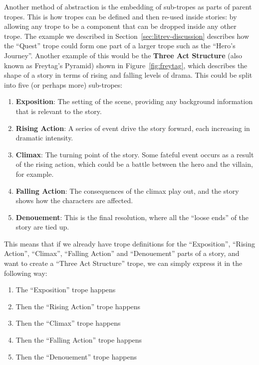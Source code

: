 \documentclass[11pt]{report}
\begin{document}
Another method of abstraction is the embedding of sub-tropes as parts of
parent tropes. This is how tropes can be defined and then re-used inside stories: by allowing any
trope to be a component that can be dropped inside any other trope.
The example we described in Section~\ref{sec:litrev-discussion}
describes how the ``Quest'' trope could form one part of a larger trope
such as the ``Hero's Journey''. Another example of this would be the
\textbf{Three Act Structure} (also known as Freytag's Pyramid) shown in Figure~\ref{fig:freytag}, which describes the shape of a
story in terms of rising and falling levels of drama. This could be split into
five (or perhaps more) sub-tropes:

\begin{enumerate}
  \item \textbf{Exposition}: The setting of the scene, providing any background
    information that is relevant to the story.
  \item \textbf{Rising Action}: A series of event drive the story forward, each
    increasing in dramatic intensity.
  \item \textbf{Climax}: The turning point of the story. Some fateful event
    occurs as a result of the rising action, which could be a battle between the
    hero and the villain, for example.
  \item \textbf{Falling Action}: The consequences of the climax play out, and
    the story shows how the characters are affected.
  \item \textbf{Denouement}: This is the final resolution, where all the ``loose
    ends'' of the story are tied up.
\end{enumerate}

This means that if we already have trope definitions for the ``Exposition'',
``Rising Action'', ``Climax'', ``Falling Action'' and ``Denouement'' parts of a
story, and want to create a ``Three Act Structure'' trope, we can simply express
it in the following way:

\begin{enumerate}
  \item The ``Exposition'' trope happens
  \item Then the ``Rising Action'' trope happens
  \item Then the ``Climax'' trope happens
  \item Then the ``Falling Action'' trope happens
  \item Then the ``Denouement'' trope happens
\end{enumerate}
\end{document}
